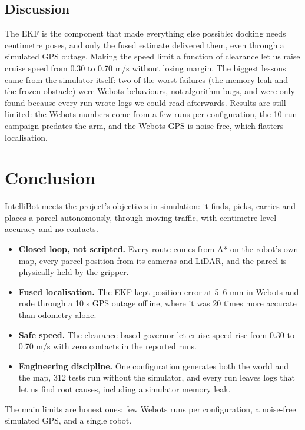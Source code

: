 \documentclass[conference]{IEEEtran}
\begin{document}
\subsection{Discussion}
The EKF is the component that made everything else possible: docking needs centimetre poses, and only the fused estimate delivered them, even through a simulated GPS outage. Making the speed limit a function of clearance let us raise cruise speed from 0.30 to 0.70 m/s without losing margin. The biggest lessons came from the simulator itself: two of the worst failures (the memory leak and the frozen obstacle) were Webots behaviours, not algorithm bugs, and were only found because every run wrote logs we could read afterwards. Results are still limited: the Webots numbers come from a few runs per configuration, the 10-run campaign predates the arm, and the Webots GPS is noise-free, which flatters localisation.

\section{Conclusion}
IntelliBot meets the project's objectives in simulation: it finds, picks, carries and places a parcel autonomously, through moving traffic, with centimetre-level accuracy and no contacts.

\begin{itemize}
\item \textbf{Closed loop, not scripted.} Every route comes from A* on the robot's own map, every parcel position from its cameras and LiDAR, and the parcel is physically held by the gripper.
\item \textbf{Fused localisation.} The EKF kept position error at 5--6 mm in Webots and rode through a 10 s GPS outage offline, where it was 20 times more accurate than odometry alone.
\item \textbf{Safe speed.} The clearance-based governor let cruise speed rise from 0.30 to 0.70 m/s with zero contacts in the reported runs.
\item \textbf{Engineering discipline.} One configuration generates both the world and the map, 312 tests run without the simulator, and every run leaves logs that let us find root causes, including a simulator memory leak.
\end{itemize}
The main limits are honest ones: few Webots runs per configuration, a noise-free simulated GPS, and a single robot.
\end{document}
